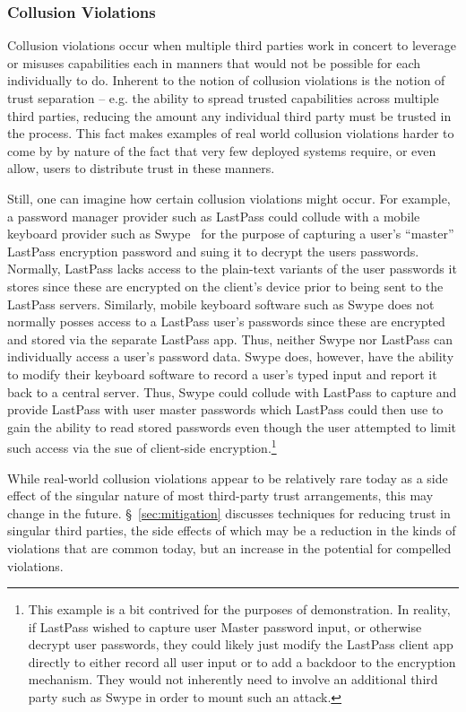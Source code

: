 \subsubsection{Collusion Violations}

Collusion violations occur when multiple third parties work in concert
to leverage or misuses capabilities each in manners that would not be
possible for each individually to do. Inherent to the notion of
collusion violations is the notion of trust separation -- e.g. the
ability to spread trusted capabilities across multiple third parties,
reducing the amount any individual third party must be trusted in the
process. This fact makes examples of real world collusion violations
harder to come by by nature of the fact that very few deployed systems
require, or even allow, users to distribute trust in these manners.

Still, one can imagine how certain collusion violations might
occur. For example, a password manager provider such as LastPass could
collude with a mobile keyboard provider such as Swype~\cite{swype} for
the purpose of capturing a user's ``master'' LastPass encryption
password and suing it to decrypt the users passwords. Normally,
LastPass lacks access to the plain-text variants of the user passwords
it stores since these are encrypted on the client's device prior to
being sent to the LastPass servers. Similarly, mobile keyboard
software such as Swype does not normally posses access to a LastPass
user's passwords since these are encrypted and stored via the separate
LastPass app. Thus, neither Swype nor LastPass can individually access
a user's password data. Swype does, however, have the ability to
modify their keyboard software to record a user's typed input and
report it back to a central server. Thus, Swype could collude with
LastPass to capture and provide LastPass with user master passwords
which LastPass could then use to gain the ability to read stored
passwords even though the user attempted to limit such access via the
sue of client-side encryption.\footnote{This example is a bit
  contrived for the purposes of demonstration. In reality, if LastPass
  wished to capture user Master password input, or otherwise decrypt
  user passwords, they could likely just modify the LastPass client
  app directly to either record all user input or to add a backdoor to
  the encryption mechanism. They would not inherently need to involve
  an additional third party such as Swype in order to mount such an
  attack.}

While real-world collusion violations appear to be relatively rare
today as a side effect of the singular nature of most third-party
trust arrangements, this may change in the
future. \S~\ref{sec:mitigation} discusses techniques for reducing
trust in singular third parties, the side effects of which may be a
reduction in the kinds of violations that are common today, but an
increase in the potential for compelled violations.


